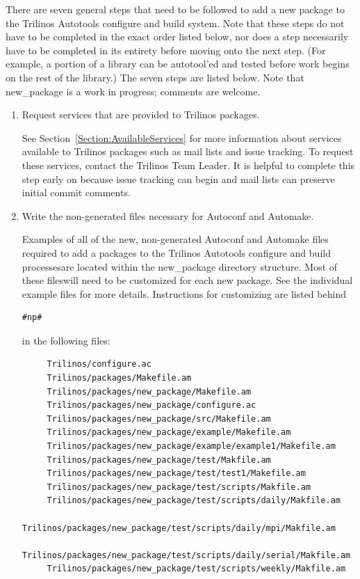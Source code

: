 \documentclass[12pt,strict]{TrilinosDevGuide}
\begin{document}
There are seven general steps that need to be followed to add a new package to
the Trilinos Autotools configure and build system.  Note that these steps do 
not have to be completed in the exact order listed below, nor does a step 
necessarily have to be completed in its entirety before moving onto the next
step.  (For example, a portion of a library can be autotool'ed and tested
before work begins on the rest of the library.)  The seven steps are listed
below.  Note that new\_package is a work in progress; comments are welcome.

\begin{enumerate}

\item Request services that are provided to Trilinos packages.

See Section~\ref{Section:AvailableServices} for more information about 
services available to Trilinos packages such as mail lists and issue 
tracking.  To request these services, contact the Trilinos Team Leader.  
It is helpful to complete this step early on because issue tracking can 
begin and mail lists can preserve initial commit comments.

\item Write the non-generated files necessary for Autoconf and Automake.

Examples of all of the new, non-generated Autoconf and Automake files
required to add a packages to the Trilinos Autotools configure and build 
processesare located within the new\_package directory structure.  Most of 
these fileswill need to be customized for each new package.  See the 
individual example files for more details.  Instructions for customizing are 
listed behind 
\begin{verbatim}
#np# 
\end{verbatim}
in the following files:
\begin{verbatim}
     Trilinos/configure.ac
     Trilinos/packages/Makefile.am
     Trilinos/packages/new_package/Makefile.am
     Trilinos/packages/new_package/configure.ac  
     Trilinos/packages/new_package/src/Makefile.am
     Trilinos/packages/new_package/example/Makefile.am
     Trilinos/packages/new_package/example/example1/Makefile.am
     Trilinos/packages/new_package/test/Makfile.am
     Trilinos/packages/new_package/test/test1/Makefile.am
     Trilinos/packages/new_package/test/scripts/Makfile.am
     Trilinos/packages/new_package/test/scripts/daily/Makfile.am
     Trilinos/packages/new_package/test/scripts/daily/mpi/Makfile.am
     Trilinos/packages/new_package/test/scripts/daily/serial/Makfile.am
     Trilinos/packages/new_package/test/scripts/weekly/Makfile.am
\end{verbatim}


\end{enumerate}
\end{document}
